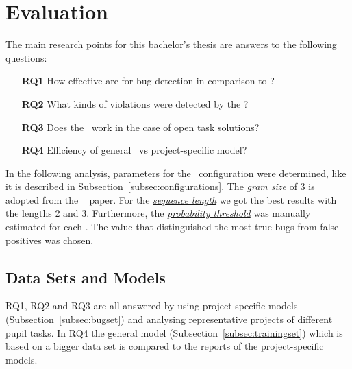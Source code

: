 
\newcommand{\numlarge}{75,277}
\newcommand{\monthstart}{December 2019}
\newcommand{\monthend}{January 2020}
\newcommand{\parsingexcp}{114}
\newcommand{\successfullyanalysed}{74,914}
\newcommand{\calculatedngrams}{138,298}
\newcommand{\creationtime}{17 days}

\chapter{Evaluation}\label{chap:evaluation}

The main research points for this bachelor's thesis are answers to the following questions:
\begin{itemize}
\item[\textbf{RQ1}] How effective are  for bug detection in comparison to \litterbox{}?
\item[\textbf{RQ2}] What kinds of violations were detected by the \ngram{}?
\item[\textbf{RQ3}] Does the \ngram\ work in the case of open task solutions?
\item[\textbf{RQ4}] Efficiency of general \ngram\ vs project-specific model?
\end{itemize}

In the following analysis, parameters for the \ngram\ configuration were determined, like it is described in Subsection~\ref{subsec:configurations}. The \hyperref[def:gram_size]{\textit{gram size}} of 3 is adopted from the \bugram{}~\cite{bugram} paper. For the \hyperref[def:sequence_length]{\textit{sequence length}} we got the best results with the lengths 2 and 3. Furthermore, the \hyperref[def:probability_threshold]{\textit{probability threshold}} was manually estimated for each \ngram{}. The value that distinguished the most true bugs from false positives was chosen.


\section{Data Sets and Models}\label{sec:dataset}
RQ1, RQ2 and RQ3 are all answered by using project-specific models (Subsection~\ref{subsec:bugset}) and analysing representative projects of different pupil tasks. In RQ4 the general model (Subsection~\ref{subsec:trainingset}) which is based on a bigger data set is compared to the reports of the project-specific models.


